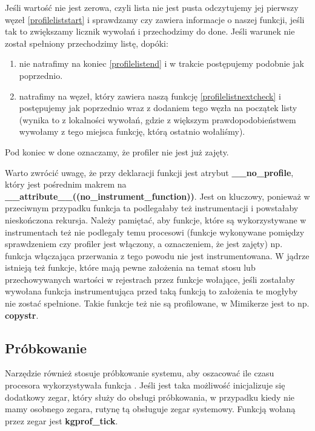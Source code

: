 \documentclass[shortabstract]{iithesis}
\theoremstyle{definition} \newtheorem*{definition}{Definicja}
\theoremstyle{definition} \newtheorem*{example}{Przykład}
\theoremstyle{definition} \newtheorem*{remark}{Uwaga}
\begin{document}
Jeśli wartość nie jest zerowa, czyli lista nie jest pusta odczytujemy jej pierwszy węzeł \ref{profileliststart} i sprawdzamy czy zawiera informacje o naszej funkcji, jeśli tak to zwiększamy licznik wywołań i przechodzimy do done. Jeśli warunek nie został spełniony przechodzimy listę, dopóki:
\begin{enumerate}
    \item nie natrafimy na koniec \ref{profilelistend} i w trakcie postępujemy podobnie jak poprzednio.
    \item natrafimy na węzeł, który zawiera naszą funkcję \ref{profilelistnextcheck} i postępujemy jak poprzednio wraz z dodaniem tego węzła na początek listy (wynika to z lokalności wywołań, gdzie z większym prawdopodobieństwem wywołamy z tego miejsca funkcję, którą ostatnio wołaliśmy).
\end{enumerate}

Pod koniec w done oznaczamy, że profiler nie jest już zajęty.

Warto zwrócić uwagę, że przy deklaracji funkcji jest atrybut \textbf{\_\_no\_profile}, który jest pośrednim makrem na \textbf{\_\_attribute\_\_((no\_instrument\_function))}. Jest on kluczowy, ponieważ w przeciwnym przypadku funkcja ta podlegałaby też instrumentacji i powstałaby nieskończona rekursja. Należy pamiętać, aby funkcje, które są wykorzystywane w instrumentach też nie podlegały temu procesowi (funkcje wykonywane pomiędzy sprawdzeniem czy profiler jest włączony, a oznaczeniem, że jest zajęty) np. funkcja włączająca przerwania z tego powodu nie jest instrumentowana. W jądrze istnieją też funkcje, które mają pewne założenia na temat stosu lub przechowywanych wartości w rejestrach przez funkcje wołające, jeśli zostałaby wywołana funkcja instrumentująca przed taką funkcją to założenia te mogłyby nie zostać spełnione. Takie funkcje też nie są profilowane, w Mimikerze jest to np. \textbf{copystr}.

\subsection{Próbkowanie}

Narzędzie również stosuje próbkowanie systemu, aby oszacować ile czasu procesora wykorzystywała funkcja \cite{bib:kgprofprofclock}. Jeśli jest taka możliwość inicjalizuje się dodatkowy zegar, który służy do obsługi próbkowania, w przypadku kiedy nie mamy osobnego zegara, rutynę tą obsługuje zegar systemowy. Funkcją wołaną przez zegar jest \textbf{kgprof\_tick}.
\end{document}
